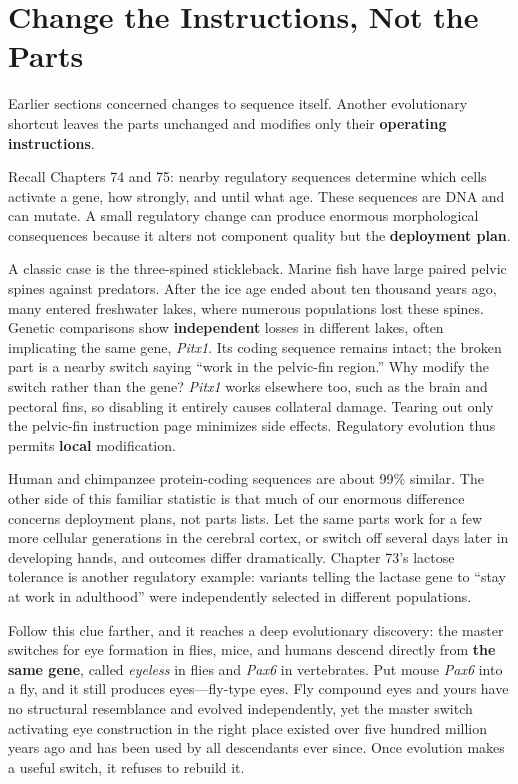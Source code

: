 \section{Change the Instructions, Not the Parts}

Earlier sections concerned changes to sequence itself. Another evolutionary shortcut leaves the parts unchanged and modifies only their \textbf{operating instructions}.

Recall Chapters 74 and 75: nearby regulatory sequences determine which cells activate a gene, how strongly, and until what age. These sequences are DNA and can mutate. A small regulatory change can produce enormous morphological consequences because it alters not component quality but the \textbf{deployment plan}.

A classic case is the three-spined stickleback. Marine fish have large paired pelvic spines against predators. After the ice age ended about ten thousand years ago, many entered freshwater lakes, where numerous populations lost these spines. Genetic comparisons show \textbf{independent} losses in different lakes, often implicating the same gene, \emph{Pitx1}. Its coding sequence remains intact; the broken part is a nearby switch saying ``work in the pelvic-fin region.'' Why modify the switch rather than the gene? \emph{Pitx1} works elsewhere too, such as the brain and pectoral fins, so disabling it entirely causes collateral damage. Tearing out only the pelvic-fin instruction page minimizes side effects. Regulatory evolution thus permits \textbf{local} modification.

Human and chimpanzee protein-coding sequences are about 99\% similar. The other side of this familiar statistic is that much of our enormous difference concerns deployment plans, not parts lists. Let the same parts work for a few more cellular generations in the cerebral cortex, or switch off several days later in developing hands, and outcomes differ dramatically. Chapter 73's lactose tolerance is another regulatory example: variants telling the lactase gene to ``stay at work in adulthood'' were independently selected in different populations.

Follow this clue farther, and it reaches a deep evolutionary discovery: the master switches for eye formation in flies, mice, and humans descend directly from \textbf{the same gene}, called \emph{eyeless} in flies and \emph{Pax6} in vertebrates. Put mouse \emph{Pax6} into a fly, and it still produces eyes---fly-type eyes. Fly compound eyes and yours have no structural resemblance and evolved independently, yet the master switch activating eye construction in the right place existed over five hundred million years ago and has been used by all descendants ever since. Once evolution makes a useful switch, it refuses to rebuild it.

